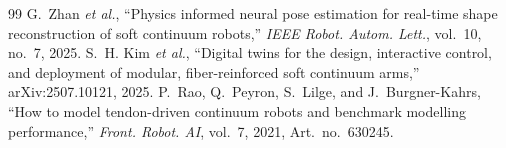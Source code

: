 \documentclass[conference]{IEEEtran}
\begin{document}
\begin{thebibliography}{99}
 G.~Zhan \emph{et al.}, ``Physics informed neural pose estimation for real-time shape reconstruction of soft continuum robots,'' \emph{IEEE Robot. Autom. Lett.}, vol.~10, no.~7, 2025.
 S.~H. Kim \emph{et al.}, ``Digital twins for the design, interactive control, and deployment of modular, fiber-reinforced soft continuum arms,'' arXiv:2507.10121, 2025.
 P.~Rao, Q.~Peyron, S.~Lilge, and J.~Burgner-Kahrs, ``How to model tendon-driven continuum robots and benchmark modelling performance,'' \emph{Front. Robot. AI}, vol.~7, 2021, Art.~no.~630245.
\end{thebibliography}
\end{document}
